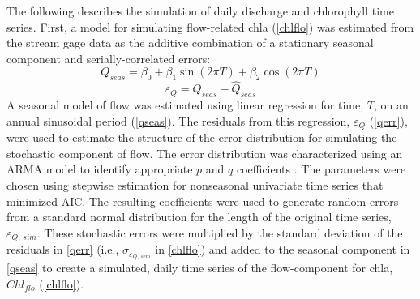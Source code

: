 \documentclass{svjour3}\usepackage[]{graphicx}\usepackage[]{color}
\begin{document}
The following describes the simulation of daily discharge and chlorophyll time series. First, a model for simulating flow-related \ac{chla} (\cref{chlflo}) was estimated from the stream gage data as the additive combination of a stationary seasonal component and serially-correlated errors:
\begin{equation} \label{qseas}
Q_{seas} = \beta_0 + \beta_1 \sin\left(2\pi T\right) + \beta_2 \cos\left(2\pi T\right)
\end{equation}
\begin{equation} \label{qerr}
\varepsilon_{Q} = Q_{seas} - \widehat{Q}_{seas}
\end{equation}
A seasonal model of flow was estimated using linear regression for time, $T$, on an annual sinusoidal period (\cref{qseas}).  The residuals from this regression, $\varepsilon_{Q}$ (\cref{qerr}), were used to estimate the structure of the error distribution for simulating the stochastic component of flow.  The error distribution was characterized using an \ac{ARMA} model to identify appropriate $p$ and $q$ coefficients \cite{Hyndman08}.  The parameters were chosen using stepwise estimation for nonseasonal univariate time series that minimized \ac{AIC}.  The resulting coefficients were used to generate random errors from a standard normal distribution for the length of the original time series, $\varepsilon_{Q,\,sim}$.  These stochastic errors were multiplied by the standard deviation of the residuals in \cref{qerr} (i.e., $\sigma_{\varepsilon_{Q,\,sim}}$ in \cref{chlflo}) and added to the seasonal component in \cref{qseas} to create a simulated, daily time series of the flow-component for \ac{chla}, $Chl_{flo}$ (\cref{chlflo}).
\end{document}
